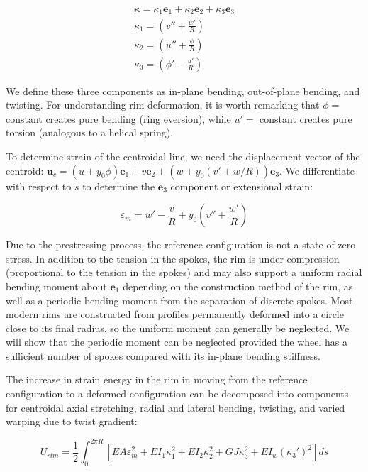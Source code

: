 \documentclass[../thesis.tex]{subfiles}
\newcommand{\eo}{\mathbf{e}_1}
\newcommand{\et}{\mathbf{e}_2}
\newcommand{\eh}{\mathbf{e}_3}
\begin{document}
\begin{subequations}
\label{eq:kappa}
\begin{align}
\mathbf{\kappa} = \kappa_1\eo + \kappa_2\et + \kappa_3\eh\\
\kappa_1 = \left( v'' + \frac{w'}{R} \right) \label{eq:kappa1}\\
\kappa_2 = \left( u'' + \frac{\phi}{R} \right) \label{eq:kappa2}\\
\kappa_3 = \left( \phi' - \frac{u'}{R} \right) \label{eq:kappa3}
\end{align}
\end{subequations}

We define these three components as in-plane bending, out-of-plane bending, and twisting. For understanding rim deformation, it is worth remarking that $\phi=$ constant creates pure bending (ring eversion), while $u'=$ constant creates pure torsion (analogous to a helical spring).

To determine strain of the centroidal line, we need the displacement vector of the centroid: $\mathbf{u}_c = (u+y_0\phi)\eo + v\et + (w+y_0 (v'+w/R))\eh$. We differentiate with respect to $s$ to determine the $\eh$ component or extensional strain:

\begin{equation}
\label{eq:mem_strain}
\varepsilon_m = w' - \frac{v}{R} + y_0\left(v'' + \frac{w'}{R} \right)
\end{equation}

Due to the prestressing process, the reference configuration is not a state of zero stress. In addition to the tension in the spokes, the rim is under compression\cite{Sharp} (proportional to the tension in the spokes) and may also support a uniform radial bending moment about $\eo$ depending on the construction method of the rim, as well as a periodic bending moment from the separation of discrete spokes. Most modern rims are constructed from profiles permanently deformed into a circle close to its final radius, so the uniform moment can generally be neglected. We will show that the periodic moment can be neglected provided the wheel has a sufficient number of spokes compared with its in-plane bending stiffness.

The increase in strain energy in the rim in moving from the reference configuration to a deformed configuration can be decomposed into components for centroidal axial stretching, radial and lateral bending, twisting, and varied warping due to twist gradient:

\begin{equation}
\label{eq:U_rim}
U_{rim} = \frac{1}{2} \int_0^{2\pi R}[EA\varepsilon_m^2 + EI_1\kappa_1^2+EI_2\kappa_2^2 + GJ\kappa_3^2 + EI_w(\kappa_3')^2]ds
\end{equation}
\end{document}
